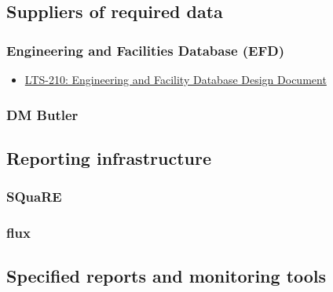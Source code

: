 \subsection{Suppliers of required data}
\label{sec:orgda99e9c}
\subsubsection{Engineering and Facilities Database (EFD)}
\label{sec:orgbb37c6f}
\begin{itemize}
\item \href{https://ls.st/LTS-210}{LTS-210: Engineering and Facility Database Design Document}
\end{itemize}
\subsubsection{DM Butler}
\label{sec:orgbe7ee1c}
\subsection{Reporting infrastructure}
\label{sec:org0c0d061}
\subsubsection{SQuaRE}
\label{sec:org6c937dc}
\subsubsection{flux}
\label{sec:orgaa20903}
\subsection{Specified reports and monitoring tools}
\label{sec:org5de654b}
